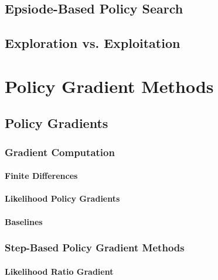 		\subsection{Epsiode-Based Policy Search} %

		\subsection{Exploration vs. Exploitation} %

	\section{Policy Gradient Methods} %

		\subsection{Policy Gradients} %

			\subsubsection{Gradient Computation} %

				\paragraph{Finite Differences} %

				\paragraph{Likelihood Policy Gradients} %

				\paragraph{Baselines} %

			\subsubsection{Step-Based Policy Gradient Methods} %

				\paragraph{Likelihood Ratio Gradient} %

